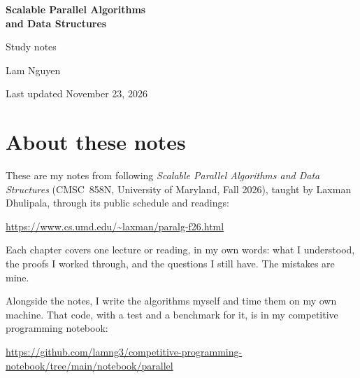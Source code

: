 \documentclass[11pt,letterpaper]{report}
\newcommand{\updated}{November 23, 2026}
\theoremstyle{plain}
\theoremstyle{definition}
\theoremstyle{remark}
\begin{document}
\begin{titlepage}
  \vspace*{1.8in}
  {\LARGE\bfseries Scalable Parallel Algorithms\\[4pt] and Data Structures\par}
  \vspace{12pt}
  {\Large Study notes\par}
  \vspace{36pt}
  {\large Lam Nguyen\par}
  \vspace{6pt}
  Last updated \updated\par
\end{titlepage}

\chapter*{About these notes}

These are my notes from following \emph{Scalable Parallel Algorithms and Data Structures} (CMSC~858N, University of Maryland, Fall 2026), taught by Laxman Dhulipala, through its public schedule and readings:
\begin{center}
  \url{https://www.cs.umd.edu/~laxman/paralg-f26.html}
\end{center}
Each chapter covers one lecture or reading, in my own words: what I understood, the proofs I worked through, and the questions I still have. The mistakes are mine.

Alongside the notes, I write the algorithms myself and time them on my own machine. That code, with a test and a benchmark for it, is in my competitive programming notebook:
\begin{center}
  \url{https://github.com/lamng3/competitive-programming-notebook/tree/main/notebook/parallel}
\end{center}

\tableofcontents


\end{document}
